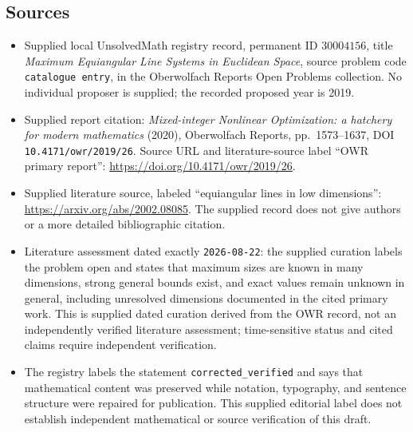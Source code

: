 \documentclass[11pt]{article}
\begin{document}
\subsection{Sources}
\begin{itemize}
\item Supplied local UnsolvedMath registry record, permanent ID \(30004156\), title \emph{Maximum Equiangular Line Systems in Euclidean Space}, source problem code \texttt{catalogue entry}, in the Oberwolfach Reports Open Problems collection. No individual proposer is supplied; the recorded proposed year is 2019.
\item Supplied report citation: \emph{Mixed-integer Nonlinear Optimization: a hatchery for modern mathematics} (2020), Oberwolfach Reports, pp.\ 1573--1637, DOI \texttt{10.4171/owr/2019/26}. Source URL and literature-source label ``OWR primary report'': \url{https://doi.org/10.4171/owr/2019/26}.
\item Supplied literature source, labeled ``equiangular lines in low dimensions'': \url{https://arxiv.org/abs/2002.08085}. The supplied record does not give authors or a more detailed bibliographic citation.
\item Literature assessment dated exactly \texttt{2026-08-22}: the supplied curation labels the problem open and states that maximum sizes are known in many dimensions, strong general bounds exist, and exact values remain unknown in general, including unresolved dimensions documented in the cited primary work. This is supplied dated curation derived from the OWR record, not an independently verified literature assessment; time-sensitive status and cited claims require independent verification.
\item The registry labels the statement \texttt{corrected\_verified} and says that mathematical content was preserved while notation, typography, and sentence structure were repaired for publication. This supplied editorial label does not establish independent mathematical or source verification of this draft.
\end{itemize}
\end{document}
